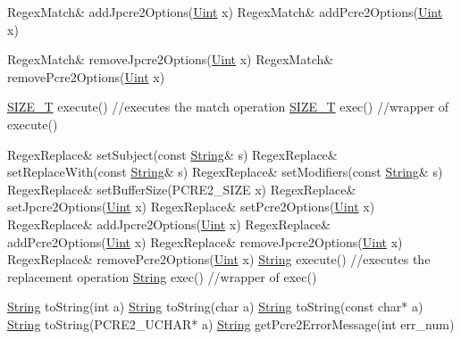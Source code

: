 \begin{DoxyCode}
RegexMatch&         addJpcre2Options(\hyperlink{namespacejpcre2_a078242d38221a13fb3543b9edd78c099}{Uint} x)
RegexMatch&         addPcre2Options(\hyperlink{namespacejpcre2_a078242d38221a13fb3543b9edd78c099}{Uint} x)

RegexMatch&         removeJpcre2Options(\hyperlink{namespacejpcre2_a078242d38221a13fb3543b9edd78c099}{Uint} x)
RegexMatch&         removePcre2Options(\hyperlink{namespacejpcre2_a078242d38221a13fb3543b9edd78c099}{Uint} x) 

\hyperlink{namespacejpcre2_a2aac465ddcb123560c7c8215dd69246c}{SIZE\_T}              execute()  \textcolor{comment}{//executes the match operation}
\hyperlink{namespacejpcre2_a2aac465ddcb123560c7c8215dd69246c}{SIZE\_T}              exec()     \textcolor{comment}{//wrapper of execute()}



RegexReplace&       setSubject(const \hyperlink{namespacejpcre2_a91f03070152fb228bc116c5a737f1d16}{String}& s)
RegexReplace&       setReplaceWith(const \hyperlink{namespacejpcre2_a91f03070152fb228bc116c5a737f1d16}{String}& s)
RegexReplace&       setModifiers(const \hyperlink{namespacejpcre2_a91f03070152fb228bc116c5a737f1d16}{String}& s)
RegexReplace&       setBufferSize(PCRE2\_SIZE x)
RegexReplace&       setJpcre2Options(\hyperlink{namespacejpcre2_a078242d38221a13fb3543b9edd78c099}{Uint} x)
RegexReplace&       setPcre2Options(\hyperlink{namespacejpcre2_a078242d38221a13fb3543b9edd78c099}{Uint} x)
RegexReplace&       addJpcre2Options(\hyperlink{namespacejpcre2_a078242d38221a13fb3543b9edd78c099}{Uint} x)
RegexReplace&       addPcre2Options(\hyperlink{namespacejpcre2_a078242d38221a13fb3543b9edd78c099}{Uint} x)
RegexReplace&       removeJpcre2Options(\hyperlink{namespacejpcre2_a078242d38221a13fb3543b9edd78c099}{Uint} x)
RegexReplace&       removePcre2Options(\hyperlink{namespacejpcre2_a078242d38221a13fb3543b9edd78c099}{Uint} x)
\hyperlink{namespacejpcre2_a91f03070152fb228bc116c5a737f1d16}{String}              execute() \textcolor{comment}{//executes the replacement operation}
\hyperlink{namespacejpcre2_a91f03070152fb228bc116c5a737f1d16}{String}              exec()    \textcolor{comment}{//wrapper of exec()}



\hyperlink{namespacejpcre2_a91f03070152fb228bc116c5a737f1d16}{String}              toString(\textcolor{keywordtype}{int} a)
\hyperlink{namespacejpcre2_a91f03070152fb228bc116c5a737f1d16}{String}              toString(\textcolor{keywordtype}{char} a)
\hyperlink{namespacejpcre2_a91f03070152fb228bc116c5a737f1d16}{String}              toString(const \textcolor{keywordtype}{char}* a)
\hyperlink{namespacejpcre2_a91f03070152fb228bc116c5a737f1d16}{String}              toString(PCRE2\_UCHAR* a)
\hyperlink{namespacejpcre2_a91f03070152fb228bc116c5a737f1d16}{String}              getPcre2ErrorMessage(\textcolor{keywordtype}{int} err\_num)
\end{DoxyCode}


